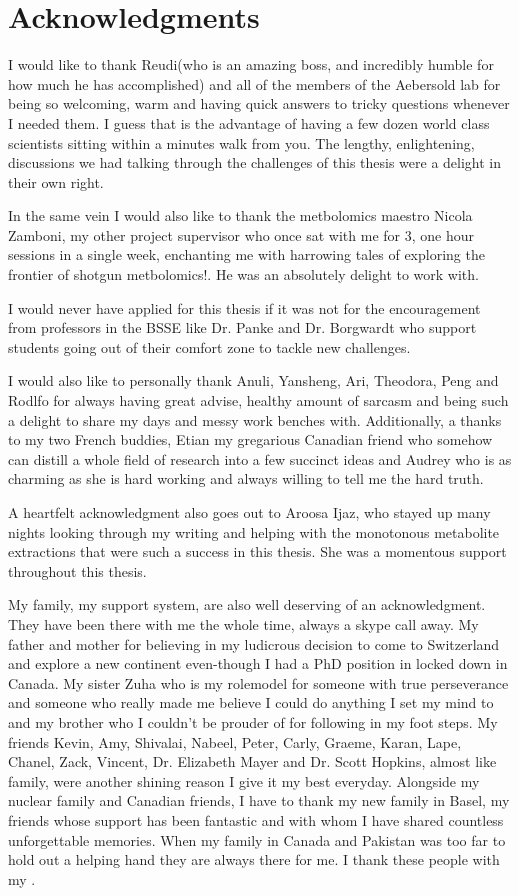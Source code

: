 \documentclass[a4paper,11pt,twoside]{book}
\begin{document}
\clearpage
\section*{Acknowledgments}
I would like to thank Reudi(who is an amazing boss, and incredibly humble for how much he has accomplished) and all of the members of the Aebersold lab for being so welcoming, warm and having quick answers to tricky questions whenever I needed them. I guess that is the advantage of having a few dozen world class scientists sitting within a minutes walk from you. The lengthy, enlightening, discussions we had talking through the challenges of this thesis were a delight in their own right. 

In the same vein I would also like to thank the metbolomics maestro Nicola Zamboni, my other project supervisor who once sat with me for 3, one hour sessions in a single week, enchanting me with harrowing tales of exploring the frontier of shotgun metbolomics!. He was an absolutely delight to work with.

I would never have applied for this thesis if it was not for the encouragement from professors in the BSSE like Dr. Panke and Dr. Borgwardt who support students going out of their comfort zone to tackle new challenges.

I would also like to personally thank Anuli, Yansheng, Ari, Theodora, Peng and Rodlfo for always having great advise, healthy amount of sarcasm and being such a delight to share my days and messy work benches with. Additionally, a thanks to my two French buddies, Etian my gregarious Canadian friend who somehow can distill a whole field of research into a few succinct ideas and Audrey who is as charming as she is hard working and always willing to tell me the hard truth. 

A heartfelt acknowledgment also goes out to Aroosa Ijaz, who stayed up many nights looking through my writing and helping with the monotonous metabolite extractions that were such a success in this thesis.  She was a momentous support throughout this thesis.

My family, my support system, are also well deserving of an acknowledgment. They have been there with me the whole time, always a skype call away. My father and mother for believing in my ludicrous decision to come to Switzerland and explore a new continent even-though I had a PhD position in locked down in Canada. My sister Zuha who is my rolemodel for someone with true perseverance and someone who really made me believe I could do anything I set my mind to and my brother who I couldn't be prouder of for following in my foot steps. My friends Kevin, Amy, Shivalai, Nabeel, Peter, Carly, Graeme, Karan, Lape, Chanel, Zack, Vincent, Dr. Elizabeth Mayer and Dr. Scott Hopkins, almost like family, were another shining reason I give it my best everyday.  Alongside my nuclear family and Canadian friends, I have to thank my new family in Basel, my friends whose support has been fantastic and with whom I have shared countless unforgettable memories. When my family in Canada and Pakistan was too far to hold out a helping hand they are always there for me. I thank these people with my .
\end{document}
